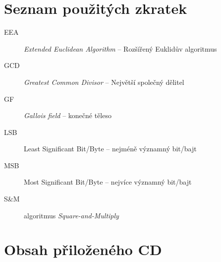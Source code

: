 \documentclass[thesis=M,czech,hidelinks]{FITthesis}[2012/06/26]
\newcommand{\0}{{\textcolor[gray]{0.100}{0}}}
\begin{document}
\chapter{Seznam použitých zkratek}
\begin{description}
        \item[EEA] \emph{Extended Euclidean Algorithm} -- Rozšířený Euklidův algoritmus
        \item[GCD] \emph{Greatest Common Divisor} -- Největší společný dělitel
        \item[GF] \emph{Gallois field} -- konečné těleso
        \item[LSB] Least Significant Bit/Byte -- nejméně významný bit/bajt
        \item[MSB] Most Significant Bit/Byte -- nejvíce významný bit/bajt
        \item[S\&M] algoritmus \emph{Square-and-Multiply}
\end{description}


\chapter{Obsah přiloženého CD}


\begin{figure}
\end{figure}
\end{document}

